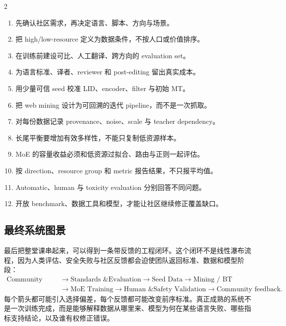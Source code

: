 \documentclass[a4paper]{article}
\begin{document}
\begingroup
\footnotesize
\setlength{\columnsep}{1.2em}
\begin{multicols}{2}
\begin{enumerate}[itemsep=0.08em,topsep=0.15em,parsep=0pt,leftmargin=*]
  \item 先确认社区需求，再决定语言、脚本、方向与场景。
  \item 把 high/low-resource 定义为数据条件，不按人口或价值排序。
  \item 在训练前建设可比、人工翻译、跨方向的 evaluation set。
  \item 为语言标准、译者、reviewer 和 post-editing 留出真实成本。
  \item 用少量可信 seed 校准 LID、encoder、filter 与初始 MT。
  \item 把 web mining 设计为可回溯的迭代 pipeline，而不是一次抓取。
  \item 对每份数据记录 provenance、noise、scale 与 teacher dependency。
  \item 长尾平衡要增加有效多样性，不能只复制低资源样本。
  \item MoE 的容量收益必须和低资源过拟合、路由与正则一起评估。
  \item 按 direction、resource group 和 metric 报告结果，不只报平均值。
  \item Automatic、human 与 toxicity evaluation 分别回答不同问题。
  \item 开放 benchmark、数据工具和模型，才能让社区继续修正覆盖缺口。
\end{enumerate}
\end{multicols}
\endgroup

\subsection{最终系统图景}

最后把整堂课串起来，可以得到一条带反馈的工程闭环。这个闭环不是线性瀑布流程，因为人类评估、安全失败与社区反馈都会迫使团队返回标准、数据和模型阶段：
\[
\begin{aligned}
\text{Community needs}
&\rightarrow\text{Standards \& Evaluation}
\rightarrow\text{Seed Data}
\rightarrow\text{Mining / BT}\\
&\rightarrow\text{MoE Training}
\rightarrow\text{Human \& Safety Validation}
\rightarrow\text{Community feedback}.
\end{aligned}
\]
每个箭头都可能引入选择偏差，每个反馈都可能改变前序标准。真正成熟的系统不是一次训练完成，而是能够解释数据从哪里来、模型为何在某些语言失败、哪些指标支持结论，以及谁有权修正错误。
\end{document}
